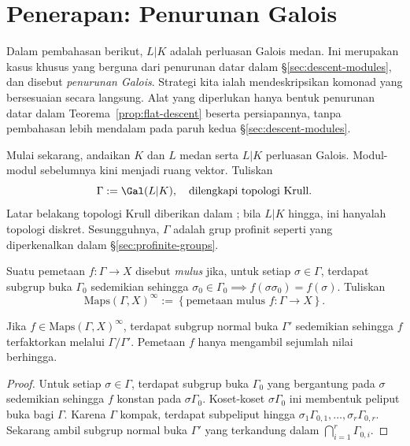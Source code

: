 
\section{Penerapan: Penurunan Galois}\label{sec:descent-Galois}
\hypertarget{o014.aljabr2.chapter7.galois-descent}{ }
Dalam pembahasan berikut, $L|K$ adalah perluasan Galois medan. Ini merupakan
kasus khusus yang berguna dari penurunan datar dalam
\S\ref{sec:descent-modules}, dan disebut \emph{penurunan Galois}. Strategi
kita ialah mendeskripsikan komonad yang bersesuaian secara langsung. Alat yang
diperlukan hanya bentuk penurunan datar dalam Teorema~\ref{prop:flat-descent}
beserta persiapannya, tanpa pembahasan lebih mendalam pada paruh kedua
\S\ref{sec:descent-modules}.

Mulai sekarang, andaikan $K$ dan $L$ medan serta $L|K$ perluasan Galois.
Modul-modul sebelumnya kini menjadi ruang vektor. Tuliskan
\[ \Gamma := \Gal(L|K), \quad \text{dilengkapi topologi Krull}. \]
Latar belakang topologi Krull diberikan dalam
\cite[\S 4.10, \S 9.2]{Li1}; bila $L|K$ hingga, ini hanyalah topologi
diskret. Sesungguhnya, $\Gamma$ adalah grup profinit seperti yang
diperkenalkan dalam \S\ref{sec:profinite-groups}.

Suatu pemetaan $f:\Gamma\to X$ disebut \emph{mulus} jika, untuk setiap
$\sigma\in\Gamma$, terdapat subgrup buka $\Gamma_0$ sedemikian sehingga
$\sigma_0\in\Gamma_0\implies f(\sigma\sigma_0)=f(\sigma)$. Tuliskan
\[ \mathrm{Maps}(\Gamma, X)^\infty := \left\{ \text{pemetaan mulus } f: \Gamma \to X \right\}. \]

\begin{lemma}\label{prop:smooth-map-finite}
	Jika $f\in\mathrm{Maps}(\Gamma,X)^\infty$, terdapat subgrup normal buka
	$\Gamma'$ sedemikian sehingga $f$ terfaktorkan melalui
	$\Gamma/\Gamma'$. Pemetaan $f$ hanya mengambil sejumlah nilai berhingga.
\end{lemma}
\begin{proof}
	Untuk setiap $\sigma\in\Gamma$, terdapat subgrup buka $\Gamma_0$ yang
	bergantung pada $\sigma$ sedemikian sehingga $f$ konstan pada
	$\sigma\Gamma_0$. Koset-koset $\sigma\Gamma_0$ ini membentuk peliput buka
	bagi $\Gamma$. Karena $\Gamma$ kompak, terdapat subpeliput hingga
	$\sigma_1\Gamma_{0,1},\ldots,\sigma_r\Gamma_{0,r}$. Sekarang ambil subgrup
	normal buka $\Gamma'$ yang terkandung dalam
	$\bigcap_{i=1}^r\Gamma_{0,i}$.
\end{proof}

